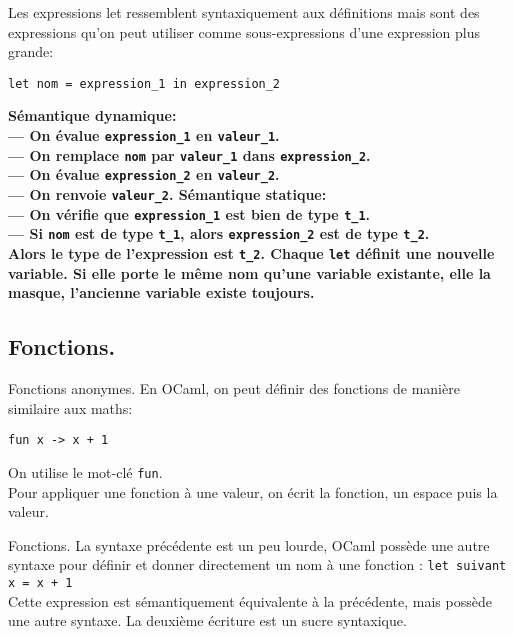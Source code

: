 \documentclass[french, 11pt]{article}
\begin{document}
\begin{defi}{}{}
    Les expressions let ressemblent syntaxiquement aux définitions mais sont des expressions qu'on peut utiliser comme sous-expressions d'une expression plus grande:
    \begin{center}
        \texttt{let nom = expression\_1 in expression\_2}
    \end{center}
    \bf{Sémantique dynamique:}\\
    --- On évalue \texttt{expression\_1} en \texttt{valeur\_1}.\\
    --- On remplace \texttt{nom} par \texttt{valeur\_1} dans \texttt{expression\_2}.\\
    --- On évalue \texttt{expression\_2} en \texttt{valeur\_2}.\\
    --- On renvoie \texttt{valeur\_2}.\n
    \bf{Sémantique statique:}\\
    --- On vérifie que \texttt{expression\_1} est bien de type \texttt{t\_1}.\\
    --- Si \texttt{nom} est de type \texttt{t\_1}, alors \texttt{expression\_2} est de type \texttt{t\_2}.\\
    Alors le type de l'expression est \texttt{t\_2}.\n
    Chaque \texttt{let} définit une nouvelle variable. Si elle porte le même nom qu'une variable existante, elle la masque, l'ancienne variable existe toujours.
\end{defi}

\subsection{Fonctions.}

\begin{defi}{Fonctions anonymes.}{}
    En OCaml, on peut définir des fonctions de manière similaire aux maths:
    \begin{center}
        \texttt{fun x -> x + 1}
    \end{center}
    On utilise le mot-clé \texttt{fun}.\\
    Pour appliquer une fonction à une valeur, on écrit la fonction, un espace puis la valeur.
\end{defi}

\begin{defi}{Fonctions.}{}
    La syntaxe précédente est un peu lourde, OCaml possède une autre syntaxe pour définir et donner directement un nom à une fonction : \texttt{let suivant x = x + 1}\\
    Cette expression est sémantiquement équivalente à la précédente, mais possède une autre syntaxe. La deuxième écriture est un sucre syntaxique.
\end{defi}
\end{document}
